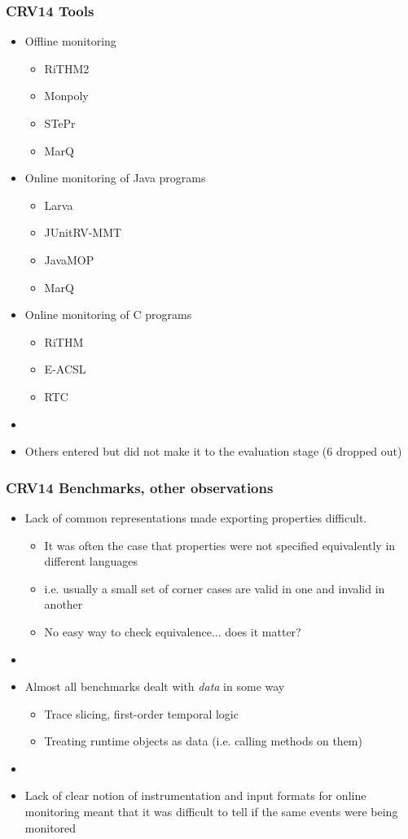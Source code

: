 \documentclass{beamer}
\begin{document}
\begin{frame}
\frametitle{CRV14 Tools}
\begin{itemize}
	\item  Offline monitoring
	\begin{itemize}
		\item RiTHM2
		\item Monpoly
		\item STePr
		\item MarQ
	\end{itemize}
	\item  Online monitoring of Java programs
	\begin{itemize}
		\item Larva
		\item JUnitRV-MMT
		\item JavaMOP
		\item MarQ
	\end{itemize}	
	\item  Online monitoring of C programs
	\begin{itemize}
		\item RiTHM
		\item E-ACSL
		\item RTC
	\end{itemize}	
	\item[]
	\item Others entered but did not make it to the evaluation stage (6 dropped out)
\end{itemize}
\end{frame}

\begin{frame}
\frametitle{CRV14 Benchmarks, other observations}
\begin{itemize}
	\item Lack of common representations made exporting properties difficult. 
	\begin{itemize}
		\item  It was often the case that properties were not specified equivalently in different languages
		\item i.e. usually a small set of corner cases are valid in one and invalid in another
		\item No easy way to check equivalence... does it matter?
	\end{itemize}
	\item[]
	\item Almost all benchmarks dealt with \emph{data} in some way
	\begin{itemize}
		\item Trace slicing, first-order temporal logic
		\item Treating runtime objects as data (i.e. calling methods on them)
	\end{itemize}
	\item[]
	\item Lack of clear notion of instrumentation and input formats for online monitoring meant that it was difficult to tell if the same events were being monitored
\end{itemize}
\end{frame}
\end{document}
